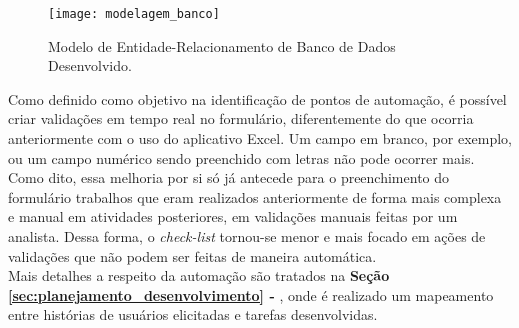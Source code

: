 	\begin{figure}[H]
		\centering
		\texttt{[image: modelagem\_banco]}
		\caption[Modelo de Entidade-Relacionamento de Banco de Dados Desenvolvido]{Modelo de Entidade-Relacionamento de Banco de Dados Desenvolvido.}
		\label{fig:bdbpms}
	\end{figure}
	Como definido como objetivo na identificação de pontos de automação, é possível criar validações em tempo real no formulário, diferentemente do que ocorria anteriormente com o uso do aplicativo Excel. Um campo em branco, por exemplo, ou um campo numérico sendo preenchido com letras não pode ocorrer mais. Como dito, essa melhoria por si só já antecede para o preenchimento do formulário trabalhos que eram realizados anteriormente de forma mais complexa e manual em atividades posteriores, em validações manuais feitas por um analista. Dessa forma, o \emph{check-list} tornou-se menor e mais focado em ações de validações que não podem ser feitas de maneira automática.
	\\ \indent Mais detalhes a respeito da automação são tratados na \textbf{Seção \ref{sec:planejamento_desenvolvimento} - }, onde é realizado um mapeamento entre histórias de usuários elicitadas e tarefas desenvolvidas.